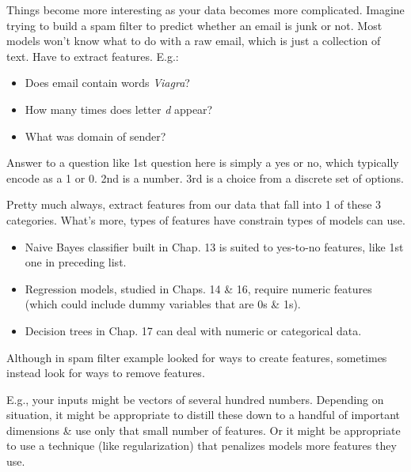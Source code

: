 \documentclass{article}
\begin{document}
\begin{itemize}
\begin{itemize}
		Things become more interesting as your data becomes more complicated. Imagine trying to build a spam filter to predict whether an email is junk or not. Most models won't know what to do with a raw email, which is just a collection of text. Have to extract features. E.g.:
		\begin{itemize}
			\item Does email contain words {\it Viagra}?
			\item How many times does letter {\it d} appear?
			\item What was domain of sender?
		\end{itemize}
		Answer to a question like 1st question here is simply a yes or no, which typically encode as a 1 or 0. 2nd is a number. 3rd is a choice from a discrete set of options.
		
		Pretty much always, extract features from our data that fall into 1 of these 3 categories. What's more, types of features have constrain types of models can use.
		\begin{itemize}
			\item Naive Bayes classifier built in Chap. 13 is suited to yes-to-no features, like 1st one in preceding list.
			\item Regression models, studied in Chaps. 14 \& 16, require numeric features (which could include dummy variables that are 0s \& 1s).
			\item Decision trees in Chap. 17 can deal with numeric or categorical data.
		\end{itemize}
		Although in spam filter example looked for ways to create features, sometimes instead look for ways to remove features.
		
		E.g., your inputs might be vectors of several hundred numbers. Depending on situation, it might be appropriate to distill these down to a handful of important dimensions \& use only that small number of features. Or it might be appropriate to use a technique (like regularization) that penalizes models more features they use.
		

\end{itemize}
\end{itemize}
\end{document}
